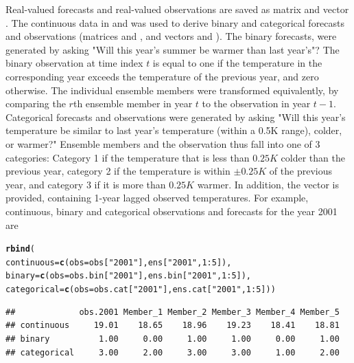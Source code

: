 \documentclass[article]{jss}\usepackage{graphicx, color}
\makeatletter
\newcommand{\hlfunctioncall}[1]{\textcolor[rgb]{0,0.501960784313725,0.752941176470588}{\textbf{#1}}}%
\newcommand{\hlstring}[1]{\textcolor[rgb]{0.650980392156863,0.52156862745098,0}{#1}}%
\newenvironment{kframe}{%
 \def\at@end@of@kframe{}%
 \ifinner\ifhmode%
  \def\at@end@of@kframe{\end{minipage}}%
  \begin{minipage}{\columnwidth}%
 \fi\fi%
 \def\FrameCommand##1{\hskip\@totalleftmargin \hskip-\fboxsep
 \colorbox{shadecolor}{##1}\hskip-\fboxsep
     \hskip-\linewidth \hskip-\@totalleftmargin \hskip\columnwidth}%
 \MakeFramed {\advance\hsize-\width
   \@totalleftmargin\z@ \linewidth\hsize
   \@setminipage}}%
 {\par\unskip\endMakeFramed%
 \at@end@of@kframe}
\newenvironment{knitrout}{}{} %
\makeatother
\begin{document}
Real-valued forecasts and real-valued observations are saved as  matrix  and  vector . 
The continuous data in  and  was used to derive binary and categorical forecasts and observations (matrices  and , and vectors  and ).
The binary forecasts, were generated by asking "Will this year's summer be warmer than last year's"?
The binary observation at time index $t$ is equal to one if the temperature in the corresponding year exceeds the temperature of the previous year, and zero otherwise.
The individual ensemble members were transformed equivalently, by comparing the $r$th ensemble member in year $t$ to the observation in year $t-1$.
Categorical forecasts and observations were generated by asking "Will this year's temperature be similar to last year's temperature (within a 0.5K range), colder, or warmer?"
Ensemble members and the observation thus fall into one of 3 categories: Category 1 if the temperature that is less than $0.25K$ colder than the previous year, category 2 if the temperature is within $\pm 0.25K$ of the previous year, and category 3 if it is more than $0.25K$ warmer.
In addition, the vector  is provided, containing 1-year lagged observed temperatures.
For example, continuous, binary and categorical observations and forecasts for the year 2001 are 

\begin{knitrout}
\color{fgcolor}\begin{kframe}
\begin{alltt}
\hlfunctioncall{rbind}(
continuous = \hlfunctioncall{c}(obs=obs[\hlstring{"2001"}], ens[\hlstring{"2001"}, 1:5]),
binary     = \hlfunctioncall{c}(obs=obs.bin[\hlstring{"2001"}], ens.bin[\hlstring{"2001"}, 1:5]),
categorical = \hlfunctioncall{c}(obs=obs.cat[\hlstring{"2001"}], ens.cat[\hlstring{"2001"}, 1:5]))
\end{alltt}
\begin{verbatim}
##             obs.2001 Member_1 Member_2 Member_3 Member_4 Member_5
## continuous     19.01    18.65    18.96    19.23    18.41    18.81
## binary          1.00     0.00     1.00     1.00     0.00     1.00
## categorical     3.00     2.00     3.00     3.00     1.00     2.00
\end{verbatim}
\end{kframe}
\end{knitrout}
\end{document}
